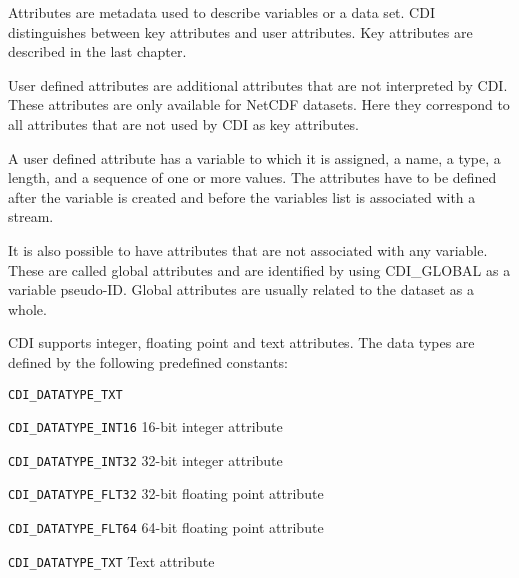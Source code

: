 Attributes are metadata used to describe variables or a data set.
CDI distinguishes between key attributes and user attributes.
Key attributes are described in the last chapter.

User defined attributes are additional attributes that are not interpreted by CDI.
These attributes are only available for NetCDF datasets. Here they
correspond to all attributes that are not used by CDI as key attributes.

A user defined attribute has a variable to which it is assigned, a name, a type,
a length, and a sequence of one or more values.
The attributes have to be defined after the variable is created and 
before the variables list is associated with a stream.

It is also possible to have attributes that are not associated with any variable.
These are called global attributes and are identified by using CDI\_GLOBAL as a 
variable pseudo-ID. Global attributes are usually related to the dataset as a whole.

CDI supports integer, floating point and text attributes. The data types are defined 
by the following predefined constants:

\vspace*{3mm}
\hspace*{8mm}\begin{minipage}{15cm}
\begin{deflist}{\large\texttt{CDI\_DATATYPE\_TXT \ \ }}
\item[\large\texttt{CDI\_DATATYPE\_INT16}]   16-bit integer attribute
\item[\large\texttt{CDI\_DATATYPE\_INT32}]   32-bit integer attribute
\item[\large\texttt{CDI\_DATATYPE\_FLT32}]   32-bit floating point attribute
\item[\large\texttt{CDI\_DATATYPE\_FLT64}]   64-bit floating point attribute
\item[\large\texttt{CDI\_DATATYPE\_TXT}]     Text attribute
\end{deflist}
\end{minipage}

